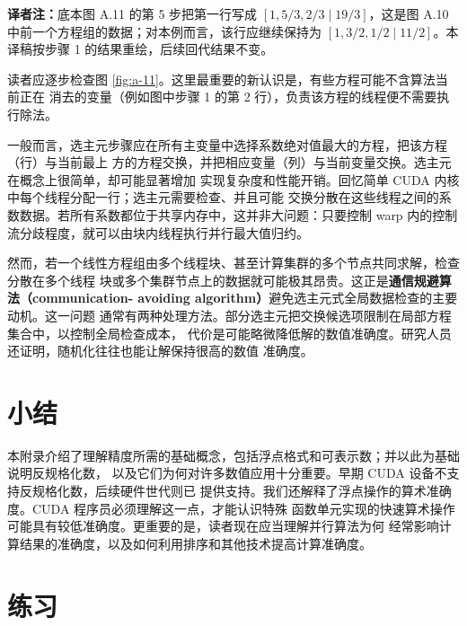 \noindent\textbf{译者注：}底本图 A.11 的第 5 步把第一行写成
$[1,5/3,2/3\mid19/3]$，这是图 A.10 中前一个方程组的数据；对本例而言，该行应继续保持为
$[1,3/2,1/2\mid11/2]$。本译稿按步骤 1 的结果重绘，后续回代结果不变。

读者应逐步检查图 \ref{fig:a-11}。这里最重要的新认识是，有些方程可能不含算法当前正在
消去的变量（例如图中步骤 1 的第 2 行），负责该方程的线程便不需要执行除法。

一般而言，选主元步骤应在所有主变量中选择系数绝对值最大的方程，把该方程（行）与当前最上
方的方程交换，并把相应变量（列）与当前变量交换。选主元在概念上很简单，却可能显著增加
实现复杂度和性能开销。回忆简单 CUDA 内核中每个线程分配一行；选主元需要检查、并且可能
交换分散在这些线程之间的系数数据。若所有系数都位于共享内存中，这并非大问题：只要控制
warp 内的控制流分歧程度，就可以由块内线程执行并行最大值归约。

然而，若一个线性方程组由多个线程块、甚至计算集群的多个节点共同求解，检查分散在多个线程
块或多个集群节点上的数据就可能极其昂贵。这正是\textbf{通信规避算法（communication-
avoiding algorithm）}避免选主元式全局数据检查的主要动机\cite{appa-ballard}。这一问题
通常有两种处理方法。部分选主元把交换候选项限制在局部方程集合中，以控制全局检查成本，
代价是可能略微降低解的数值准确度。研究人员还证明，随机化往往也能让解保持很高的数值
准确度。

\section{小结}
\label{sec:appa-summary}

本附录介绍了理解精度所需的基础概念，包括浮点格式和可表示数；并以此为基础说明反规格化数，
以及它们为何对许多数值应用十分重要。早期 CUDA 设备不支持反规格化数，后续硬件世代则已
提供支持。我们还解释了浮点操作的算术准确度。CUDA 程序员必须理解这一点，才能认识特殊
函数单元实现的快速算术操作可能具有较低准确度。更重要的是，读者现在应当理解并行算法为何
经常影响计算结果的准确度，以及如何利用排序和其他技术提高计算准确度。

\section{练习}
\label{sec:appa-exercises}

